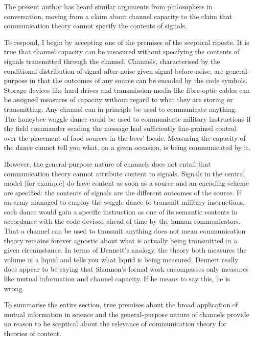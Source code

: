 \documentclass[12pt]{article}
\begin{document}
\noindent The present author has heard similar arguments from philosophers in conversation, moving from a claim about channel capacity to the claim that communication theory cannot specify the contents of signals.

To respond, I begin by accepting one of the premises of the sceptical riposte.
It is true that channel capacity can be measured without specifying the contents of signals transmitted through the channel.
Channels, characterised by the conditional distribution of signal-after-noise given signal-before-noise, are general-purpose in that the outcomes of any source can be encoded by the code symbols.
Storage devices like hard drives and transmission media like fibre-optic cables can be assigned measures of capacity without regard to what they are storing or transmitting.
Any channel can in principle be used to communicate anything.
The honeybee waggle dance could be used to communicate military instructions if the field commander sending the message had sufficiently fine-grained control over the placement of food sources in the bees' locale.
Measuring the capacity of the dance cannot tell you what, on a given occasion, is being communicated by it.

However, the general-purpose nature of channels does not entail that communication theory cannot attribute content to signals.
Signals in the central model (for example) do have content as soon as a source and an encoding scheme are specified: the contents of signals are the different outcomes of the source.
If an army managed to employ the waggle dance to transmit military instructions, each dance would gain a specific instruction as one of its semantic contents in accordance with the code devised ahead of time by the human communicators.
That a channel can be used to transmit anything does not mean communication theory remains forever agnostic about what is actually being transmitted in a given circumstance.
In terms of Dennett's analogy, the theory both measures the volume of a liquid and tells you what liquid is being measured.
Dennett really does appear to be saying that Shannon's formal work encompasses only measures like mutual information and channel capacity.
If he means to say this, he is wrong.

To summarise the entire section, true premises about the broad application of mutual information in science and the general-purpose nature of channels provide no reason to be sceptical about the relevance of communication theory for theories of content.
\end{document}
